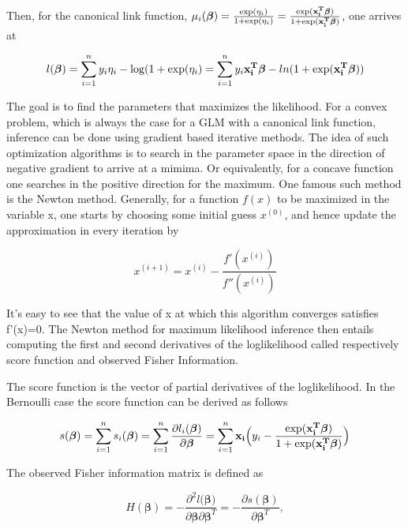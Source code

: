Then, for the canonical link function, $\mu_i(\bm{\beta}) = \frac{\exp(\eta_i)}{1+\exp(\eta_i)} = \frac{\exp({\bf x_i^T} \bm{ \beta})}{1+\exp({\bf x_i^T} \bm{ \beta})}$, one arrives at

\begin{equation}
    l(\bm{\beta}) = \sum_{i=1}^{n} y_i \eta_i - \log(1 + \exp(\eta_i) = \sum_{i=1}^n y_i{\bf x_i^T} \bm{ \beta} - ln(1 + \exp(\bf x_i^T \bm{ \beta}))
\end{equation}

The goal is to find the parameters that maximizes the likelihood. For a convex problem, which is always the case for a GLM with a canonical link function, inference can be done using gradient based iterative methods. The idea of such optimization algorithms is to search in the parameter space in the direction of negative gradient to arrive at a mimima. Or equivalently, for a concave function one searches in the positive direction for the maximum. One famous such method is the Newton method. Generally, for a function $f(x)$ to be maximized in the variable x, one starts by choosing some initial guess $x^{(0)}$, and hence update the approximation in every iteration by

\begin{equation}
    x^{(i+1)} = x^{(i)} - \frac{f'(x^{(i)})}{f''(x^{(i)})}
\end{equation}

It's easy to see that the value of x at which this algorithm converges satisfies f'(x)=0. The Newton method for maximum likelihood inference then entails computing the first and second derivatives of the loglikelihood called respectively score function and observed Fisher Information.

The score function is the vector of partial derivatives of the loglikelihood. In the Bernoulli case the score function can be derived as follows

\begin{equation}
\label{eq:score}
s(\bm{\beta}) = \sum_{i=1}^{n}s_i(\bm{\beta}) = \sum_{i=1}^{n} \frac{\partial l_i(\bm{\beta})}{\partial \bm{\beta}} = \sum_{i=1}^{n} {\bf x_i} \Big ( y_i - \frac{\exp({\bf x_i^T} \bm{ \beta})}{1 + \exp({\bf x_i^T} \bm{ \beta})}\Big )
\end{equation}

The observed Fisher information matrix is defined as 

\begin{equation}
    H(\bm {\beta}) = - \frac{\partial^2 l(\bm {\beta)}}{\partial \bm{\beta} \partial \bm{\beta}^T} = -\frac{\partial s(\bm{\beta})}{\partial \bm{\beta}^T},
\end{equation}

